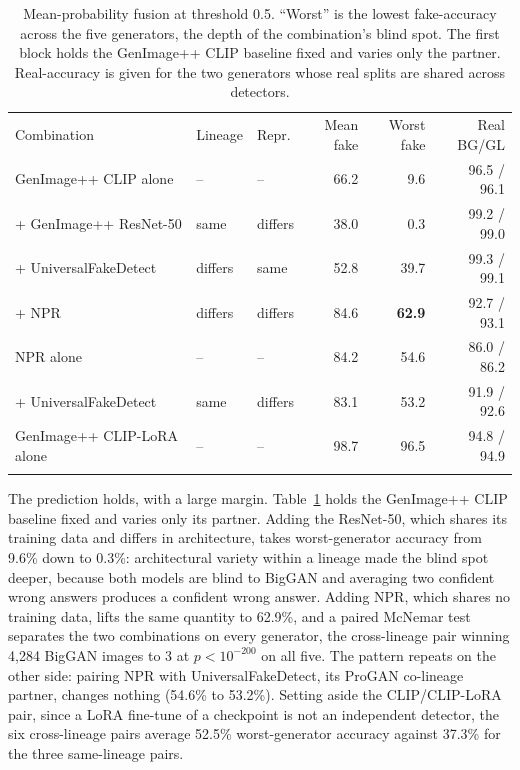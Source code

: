 \documentclass[3p,times,procedia]{elsarticle}
\begin{document}
\begin{table}[h]
\caption{Mean-probability fusion at threshold 0.5. ``Worst'' is the lowest
fake-accuracy across the five generators, the depth of the combination's
blind spot. The first block holds the GenImage++ CLIP baseline fixed and
varies only the partner. Real-accuracy is given for the two generators
whose real splits are shared across detectors.}
\label{tab:ensemble}
\begin{tabular*}{\hsize}{@{\extracolsep{\fill}}lllrrr@{}}
\toprule
Combination & Lineage & Repr. & Mean fake & Worst fake & Real BG/GL \\
\colrule
GenImage++ CLIP alone & -- & -- & 66.2 & 9.6 & 96.5 / 96.1 \\
\quad + GenImage++ ResNet-50 & same & differs & 38.0 & 0.3 & 99.2 / 99.0 \\
\quad + UniversalFakeDetect & differs & same & 52.8 & 39.7 & 99.3 / 99.1 \\
\quad + NPR & differs & differs & 84.6 & \textbf{62.9} & 92.7 / 93.1 \\
\colrule
NPR alone & -- & -- & 84.2 & 54.6 & 86.0 / 86.2 \\
\quad + UniversalFakeDetect & same & differs & 83.1 & 53.2 & 91.9 / 92.6 \\
\colrule
GenImage++ CLIP-LoRA alone & -- & -- & 98.7 & 96.5 & 94.8 / 94.9 \\
\botrule
\end{tabular*}
\end{table}

The prediction holds, with a large margin. Table~\ref{tab:ensemble} holds
the GenImage++ CLIP baseline fixed and varies only its partner. Adding the
ResNet-50, which shares its training data and differs in architecture,
takes worst-generator accuracy from 9.6\% down to 0.3\%: architectural
variety within a lineage made the blind spot deeper, because both models
are blind to BigGAN and averaging two confident wrong answers produces a
confident wrong answer. Adding NPR, which shares no training data, lifts
the same quantity to 62.9\%, and a paired McNemar test separates the two
combinations on every generator, the cross-lineage pair winning 4{,}284
BigGAN images to 3 at $p<10^{-200}$ on all five. The pattern repeats on
the other side: pairing NPR with UniversalFakeDetect, its ProGAN
co-lineage partner, changes nothing (54.6\% to 53.2\%). Setting aside the
CLIP/CLIP-LoRA pair, since a LoRA fine-tune of a checkpoint is not an
independent detector, the six cross-lineage pairs average 52.5\%
worst-generator accuracy against 37.3\% for the three same-lineage
pairs.
\end{document}
